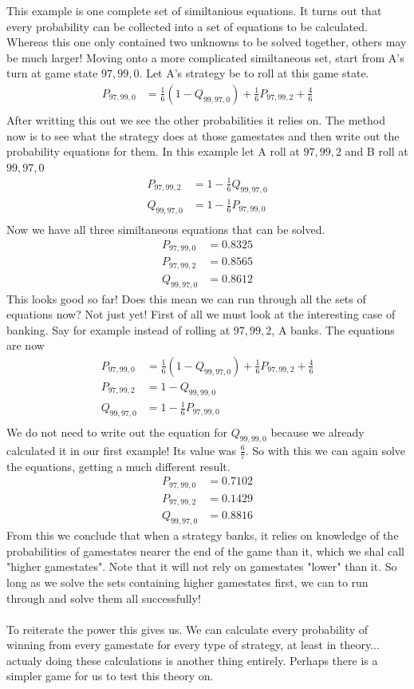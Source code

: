 \documentclass[a4paper,titlepage]{article}
\begin{document}
This example is one complete set of similtanious equations. It turns out that every probability can be collected into a set of equations to be calculated.
Whereas this one only contained two unknowns to be solved together, others may be much larger!
Moving onto a more complicated similtaneous set, start from A's turn at game state $97,99,0$. Let A's strategy be to roll at this game state.
\begin{align*}
	P_{97,99,0} &= \frac{1}{6}(1 - Q_{99,97,0})+\frac{1}{6}P_{97,99,2}+\frac{4}{6}\\
\end{align*}
After writting this out we see the other probabilities it relies on. The method now is to see what the strategy does at those gamestates and then write out the probability equations for them.
In this example let A roll at $97,99,2$ and B roll at $99,97,0$
\begin{align*}
	P_{97,99,2} &= 1 - \frac{1}{6}Q_{99,97,0}\\
	Q_{99,97,0} &= 1 - \frac{1}{6}P_{97,99,0}\\
\end{align*}
Now we have all three similtaneous equations that can be solved.
\begin{align*}
	P_{97,99,0} &= 0.8325\\
	P_{97,99,2} &= 0.8565\\
	Q_{99,97,0} &= 0.8612
\end{align*}
This looks good so far! Does this mean we can run through all the sets of equations now?
Not just yet! First of all we must look at the interesting case of banking. Say for example instead of rolling at $97,99,2$, A banks.
The equations are now
\begin{align*}
	P_{97,99,0} &= \frac{1}{6}(1 - Q_{99,97,0})+\frac{1}{6}P_{97,99,2}+\frac{4}{6}\\
	P_{97,99,2} &= 1 - Q_{99,99,0}\\
	Q_{99,97,0} &= 1 - \frac{1}{6}P_{97,99,0}\\
\end{align*}
We do not need to write out the equation for $Q_{99,99,0}$ because we already calculated it in our first example! Its value was $\frac{6}{7}$.
So with this we can again solve the equations, getting a much different result.
\begin{align*}
	P_{97,99,0} &= 0.7102\\
	P_{97,99,2} &= 0.1429\\
	Q_{99,97,0} &= 0.8816
\end{align*}
From this we conclude that when a strategy banks, it relies on knowledge of the probabilities of gamestates nearer the end of the game than it, which we shal call "higher gamestates".
Note that it will not rely on gamestates "lower" than it.
So long as we solve the sets containing higher gamestates first, we can to run through and solve them all successfully!
\\
\\
To reiterate the power this gives us. We can calculate every probability of winning from every gamestate for every type of strategy, at least in theory... actualy doing these calculations is another thing entirely.
Perhaps there is a simpler game for us to test this theory on.
\end{document}

